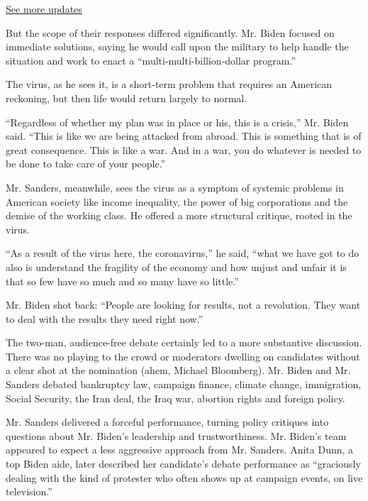 \href{https://www.nytimes.com/2020/07/31/us/elections/biden-vs-trump.html?action=click\&pgtype=Article\&state=default\&region=MAIN_CONTENT_1\&context=storylines_live_updates}{See
more updates}

But the scope of their responses differed significantly. Mr. Biden
focused on immediate solutions, saying he would call upon the military
to help handle the situation and work to enact a
``multi-multi-billion-dollar program.''

The virus, as he sees it, is a short-term problem that requires an
American reckoning, but then life would return largely to normal.

``Regardless of whether my plan was in place or his, this is a crisis,''
Mr. Biden said. ``This is like we are being attacked from abroad. This
is something that is of great consequence. This is like a war. And in a
war, you do whatever is needed to be done to take care of your people.''

Mr. Sanders, meanwhile, sees the virus as a symptom of systemic problems
in American society like income inequality, the power of big
corporations and the demise of the working class. He offered a more
structural critique, rooted in the virus.

``As a result of the virus here, the coronavirus,'' he said, ``what we
have got to do also is understand the fragility of the economy and how
unjust and unfair it is that so few have so much and so many have so
little.''

Mr. Biden shot back: ``People are looking for results, not a revolution.
They want to deal with the results they need right now.''

The two-man, audience-free debate certainly led to a more substantive
discussion. There was no playing to the crowd or moderators dwelling on
candidates without a clear shot at the nomination (ahem, Michael
Bloomberg). Mr. Biden and Mr. Sanders debated bankruptcy law, campaign
finance, climate change, immigration, Social Security, the Iran deal,
the Iraq war, abortion rights and foreign policy.

Mr. Sanders delivered a forceful performance, turning policy critiques
into questions about Mr. Biden's leadership and trustworthiness. Mr.
Biden's team appeared to expect a less aggressive approach from Mr.
Sanders. Anita Dunn, a top Biden aide, later described her candidate's
debate performance as ``graciously dealing with the kind of protester
who often shows up at campaign events, on live television.''

